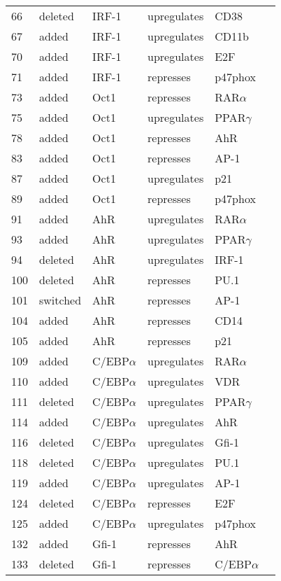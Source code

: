 \begin{center}
\begin{scriptsize}
\begin{supertabular}{|p{2 cm}|p{2cm}|p{3cm}|p{2.5cm}|p{2cm}|p{1.5cm}|}
66 &  deleted &  IRF-1  & upregulates &  CD38 & \\
67 &  added &  IRF-1  & upregulates &  CD11b & \\
70 &  added &  IRF-1  & upregulates &  E2F & \\
71 &  added &  IRF-1  & represses &  p47phox & \\
73 &  added &  Oct1  & represses &  RAR$\alpha$ & \cite{Kakizawa1999}\\
75 &  added &  Oct1  & upregulates &  PPAR$\gamma$ & \\
78 &  added &  Oct1  & represses &  AhR & \\
83 &  added &  Oct1  & represses &  AP-1 & \cite{Ullman1993}\\
87 &  added &  Oct1  & upregulates &  p21 & \\
89 &  added &  Oct1  & represses &  p47phox & \\
91 &  added &  AhR  & upregulates &  RAR$\alpha$ & \cite{Widerak2006}\\
93 &  added &  AhR  & upregulates &  PPAR$\gamma$ & \\
94 &  deleted &  AhR  & upregulates &  IRF-1 & \\
100 &  deleted &  AhR  & represses &  PU.1 & \\
101 &  switched &  AhR  & represses &  AP-1 & \\
104 &  added &  AhR  & represses &  CD14 & \\
105 &  added &  AhR  & represses &  p21 & \\
109 &  added &  C/EBP$\alpha$  & upregulates &  RAR$\alpha$ & \\
110 &  added &  C/EBP$\alpha$  & upregulates &  VDR & \\
111 &  deleted &  C/EBP$\alpha$  & upregulates &  PPAR$\gamma$ & \\
114 &  added &  C/EBP$\alpha$  & upregulates &  AhR & \\
116 &  deleted &  C/EBP$\alpha$  & upregulates &  Gfi-1 & \\
118 &  deleted &  C/EBP$\alpha$  & upregulates &  PU.1 & \\
119 &  added &  C/EBP$\alpha$  & upregulates &  AP-1 & \\
124 &  deleted &  C/EBP$\alpha$  & represses &  E2F & \\
125 &  added &  C/EBP$\alpha$  & upregulates &  p47phox & \\
132 &  added &  Gfi-1  & represses &  AhR & \\
133 &  deleted &  Gfi-1  & represses &  C/EBP$\alpha$ & \\

\end{supertabular}
\end{scriptsize}
\end{center}

